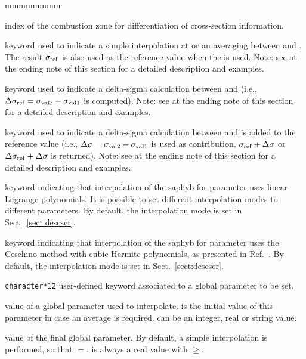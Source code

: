 \begin{ListeDeDescription}{mmmmmmmm}
\item[\dusa{ivarty}] index of the combustion zone for differentiation of cross-section information.

\item[\moc{SET}] keyword used to indicate a simple interpolation at  or an averaging between  and . The result $\sigma_{\rm ref}$ is also used as the reference value when the  is used. Note: see at the ending note of this section for a detailed description and examples.

\item[\moc{DELTA}] keyword used to indicate a delta-sigma calculation between  and 
(i.e., $\Delta\sigma_{\rm ref}=\sigma_{\rm val2}-\sigma_{\rm val1}$ is computed). Note: see at the ending note of this section for a detailed description and examples.

\item[\moc{ADD}] keyword used to indicate a delta-sigma calculation between  and  is added to the reference value
(i.e., $\Delta\sigma=\sigma_{\rm val2}-\sigma_{\rm val1}$ is used as contribution, $\sigma_{\rm ref}+\Delta\sigma$ or $\Delta\sigma_{\rm ref}+\Delta\sigma$ is returned). Note: see at the ending note of this section for a detailed description and examples.

\item[\moc{LINEAR}] keyword indicating that interpolation of the {\sc saphyb} for parameter  uses linear Lagrange
polynomials. It is possible to set different interpolation modes to different parameters. By default, the interpolation mode is set in Sect.~\ref{sect:descscr}.

\item[\moc{CUBIC}] keyword indicating that interpolation of the {\sc saphyb} for parameter  uses the Ceschino method
with cubic Hermite polynomials, as presented in Ref.~. By default, the interpolation mode is set in Sect.~\ref{sect:descscr}.

\item[\dusa{PARKEY}] {\tt character*12} user-defined keyword associated to a global
parameter to be set.

\item[\dusa{val1}] value of a global parameter used to interpolate.   is the initial value of this parameter in case an average is required.  can be an integer, real or string value.

\item[\dusa{val2}] value of the final global parameter. By default, a simple interpolation is performed, so that $=$.  is always a real value with $\ge$.


\end{ListeDeDescription}
